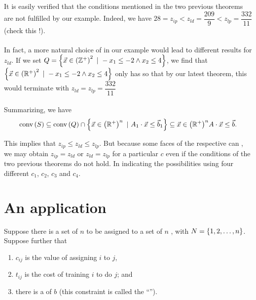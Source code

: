 It is easily verified that the conditions mentioned in the two previous theorems are not fulfilled by our example. Indeed, we have $28=z_{ip}<z_{ld}=\dfrac{209}{9}<z_{lp}=\dfrac{332}{11}$ (check this !).

\paragraph{}
In fact, a more natural choice of  in our example would lead to different results for $z_{ld}$. If we set $Q=\left\{ \vec{x}\in\left( \mathbb{Z}^+ \right)^2\ |\ -x_1\leq-2\wedge x_2\leq4 \right\}$, we find that $\left\{ \vec{x}\in\left( \mathbb{R}^+ \right)^2\ |\ -x_1\leq-2\wedge x_2\leq4 \right\}$ only has  so that by our latest theorem, this  would terminate with
$z_{ld}=z_{lp}=\dfrac{332}{11}$

\paragraph{}
Summarizing, we have
\begin{equation}
\mbox{conv}\left( S \right)\subseteq\mbox{conv}\left( Q \right)\cap\left\{ \vec{x}\in\left( \mathbb{R}^+ \right)^n\ |\ A_1\cdot\vec{x}\leq\vec{b}_1 \right\}\subseteq{\vec{x}\in\ensuremath{\left( \mathbb{R}^+ \right)}^n}{A\cdot\vec{x}\leq\vec{b}}.
\end{equation}

This implies that $z_{ip}\leq z_{ld}\leq z_{lp}$. But because some faces of the respective  can , we may obtain $z_{ip}=z_{ld}$ or $z_{ld}=z_{lp}$ for a particular $c$ even if the conditions of the two previous theorems do not hold. In  indicating the possibilities using four different  $c_1$, $c_2$, $c_3$ and $c_4$.


\section{An application}

Suppose there is a set of $n$  to be assigned to a set of $n$ , with $N=\left\{ 1,2,\ldots,n \right\}$. Suppose further that

\begin{enumerate}
 \item $c_{ij}$ is the value of assigning  $i$ to  $j$,
 \item $t_{ij}$ is the cost of training  $i$ to do  $j$; and
 \item there is a  of $b$  (this constraint is called the ``'').
\end{enumerate}

